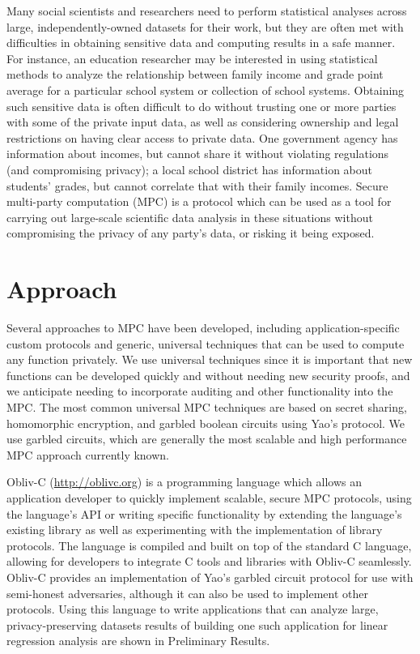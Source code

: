 \documentclass[conference]{IEEEtran}
\begin{document}
Many social scientists and researchers need to perform statistical
analyses across large, independently-owned datasets for their work, but
they are often met with difficulties in obtaining sensitive data and
computing results in a safe manner.  For instance, an education
researcher may be interested in using statistical methods to analyze the
relationship between family income and grade point average for a
particular school system or collection of school systems.  Obtaining
such sensitive data is often difficult to do without trusting one or
more parties with some of the private input data, as well as considering
ownership and legal restrictions on having clear access to private data.
One government agency has information about incomes, but cannot share it
without violating regulations (and compromising privacy); a local school
district has information about students' grades, but cannot correlate
that with their family incomes.  Secure multi-party computation (MPC) is
a protocol which can be used as a tool for carrying out large-scale
scientific data analysis in these situations without compromising the
privacy of any party's data, or risking it being exposed.

\section{Approach}

Several approaches to MPC have been developed, including
application-specific custom protocols and generic, universal techniques
that can be used to compute any function privately.  We use universal
techniques since it is important that new functions can be developed
quickly and without needing new security proofs, and we anticipate
needing to incorporate auditing and other functionality into the MPC.
The most common universal MPC techniques are based on secret sharing,
homomorphic encryption, and garbled boolean circuits using Yao's
protocol.  We use garbled circuits, which are generally the most
scalable and high performance MPC approach currently known.

Obliv-C (\url{http://oblivc.org}) is a programming language which allows
an application developer to quickly implement scalable, secure MPC
protocols, using the language’s API or writing specific functionality by
extending the language's existing library as well as experimenting with
the implementation of library
protocols\cite{cryptoeprint:2015:1153}. The language is compiled and
built on top of the standard C language, allowing for developers to
integrate C tools and libraries with Obliv-C seamlessly.  Obliv-C
provides an implementation of Yao's garbled circuit protocol for use
with semi-honest adversaries, although it can also be used to implement
other protocols. Using this language to write applications that can
analyze large, privacy-preserving datasets results of building one such
application for linear regression analysis are shown in Preliminary
Results.
\end{document}
